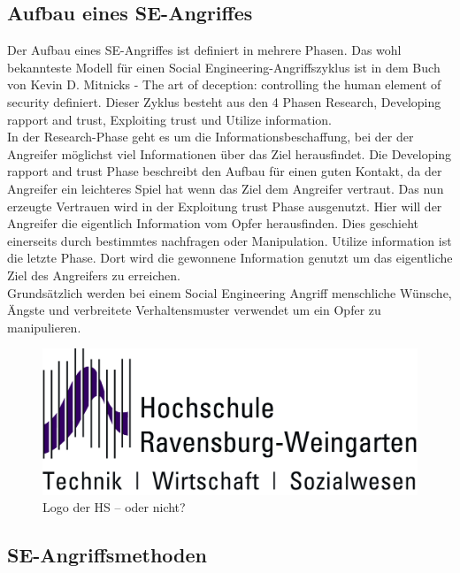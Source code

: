 	\subsection{Aufbau eines SE-Angriffes}
	Der Aufbau eines SE-Angriffes ist definiert in mehrere Phasen. Das wohl bekannteste Modell für einen Social Engineering-Angriffszyklus ist in dem Buch von Kevin D. Mitnicks - The art of deception: controlling the human element of security \cite{ArtOfDeception} definiert. Dieser Zyklus besteht aus den 4 Phasen Research, Developing rapport and trust, Exploiting trust und Utilize information.\\
	In der Research-Phase geht es um die Informationsbeschaffung, bei der der Angreifer möglichst viel Informationen über das Ziel herausfindet. Die Developing rapport and trust Phase beschreibt den Aufbau für einen guten Kontakt, da der Angreifer ein leichteres Spiel hat wenn das Ziel dem Angreifer vertraut. Das nun erzeugte Vertrauen wird in der Exploitung trust Phase ausgenutzt. Hier will der Angreifer die eigentlich Information vom Opfer herausfinden. Dies geschieht einerseits durch bestimmtes nachfragen oder Manipulation. Utilize information ist die letzte Phase. Dort wird die gewonnene Information genutzt um das eigentliche Ziel des Angreifers zu erreichen.\\
	Grundsätzlich werden bei einem Social Engineering Angriff menschliche Wünsche, Ängste und verbreitete Verhaltensmuster verwendet um ein Opfer zu manipulieren.\cite{LeitfadenSE}\\
		\FloatBarrier
		\begin{figure}
			\begin{center}
				\includegraphics*{bilder/HSLogoWGd}
				\caption{Logo der HS -- oder nicht?}
				\label{fig:logo}
			\end{center}
		\end{figure}
	\subsection{SE-Angriffsmethoden}
